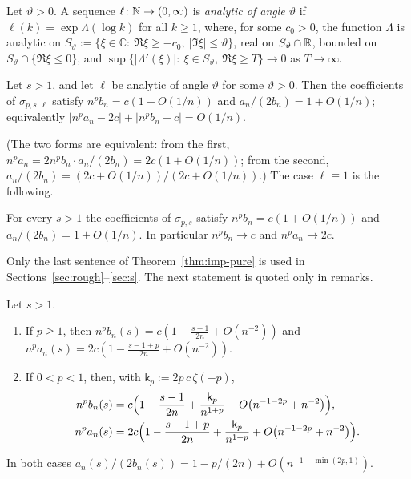 \begin{definition}\label{def:analytic}
Let $\vartheta>0$. A sequence $\ell\colon\mathbb{N}\to(0,\infty)$ is \emph{analytic of angle $\vartheta$} if
$\ell(k)=\exp\Lambda(\log k)$ for all $k\ge1$, where, for some $c_0>0$, the function $\Lambda$ is analytic on
$S_\vartheta:=\{\xi\in\mathbb C:\ \Re\xi\ge-c_0,\ |\Im\xi|\le\vartheta\}$, real on $S_\vartheta\cap\mathbb{R}$, bounded on
$S_\vartheta\cap\{\Re\xi\le0\}$, and $\sup\{|\Lambda'(\xi)|:\ \xi\in S_\vartheta,\ \Re\xi\ge T\}\to0$ as $T\to\infty$.
\end{definition}

\begin{theorem}\label{thm:imp-analytic}
Let $s>1$, and let $\ell$ be analytic of angle $\vartheta$ for some $\vartheta>0$. Then the coefficients of
$\sigma_{p,s,\ell}$ satisfy $n^pb_n=c(1+O(1/n))$ and $a_n/(2b_n)=1+O(1/n)$; equivalently
$|n^pa_n-2c|+|n^pb_n-c|=O(1/n)$.
\end{theorem}

(The two forms are equivalent: from the first, $n^pa_n=2n^pb_n\cdot a_n/(2b_n)=2c(1+O(1/n))$; from the second,
$a_n/(2b_n)=(2c+O(1/n))/(2c+O(1/n))$.) The case $\ell\equiv1$ is the following.

\begin{theorem}\label{thm:imp-pure}
For every $s>1$ the coefficients of $\sigma_{p,s}$ satisfy $n^pb_n=c(1+O(1/n))$ and $a_n/(2b_n)=1+O(1/n)$. In
particular $n^pb_n\to c$ and $n^pa_n\to2c$.
\end{theorem}

Only the last sentence of Theorem~\ref{thm:imp-pure} is used in Sections~\ref{sec:rough}--\ref{sec:s}. The next
statement is quoted only in remarks.

\begin{theorem}\label{thm:imp-second}
Let $s>1$.
\begin{enumerate}
\item[\textup{(i)}] If $p\ge1$, then $n^pb_n(s)=c(1-\frac{s-1}{2n}+O(n^{-2}))$ and
  $n^pa_n(s)=2c(1-\frac{s-1+p}{2n}+O(n^{-2}))$.
\item[\textup{(ii)}] If $0<p<1$, then, with $\mathsf k_p:=2p\,c\,\zeta(-p)$,
  \begin{align*}
    n^pb_n(s)&=c\Bigl(1-\frac{s-1}{2n}+\frac{\mathsf k_p}{n^{1+p}}+O\bigl(n^{-1-2p}+n^{-2}\bigr)\Bigr),\\
    n^pa_n(s)&=2c\Bigl(1-\frac{s-1+p}{2n}+\frac{\mathsf k_p}{n^{1+p}}+O\bigl(n^{-1-2p}+n^{-2}\bigr)\Bigr).
  \end{align*}
\end{enumerate}
In both cases $a_n(s)/(2b_n(s))=1-p/(2n)+O(n^{-1-\min(2p,1)})$.
\end{theorem}

